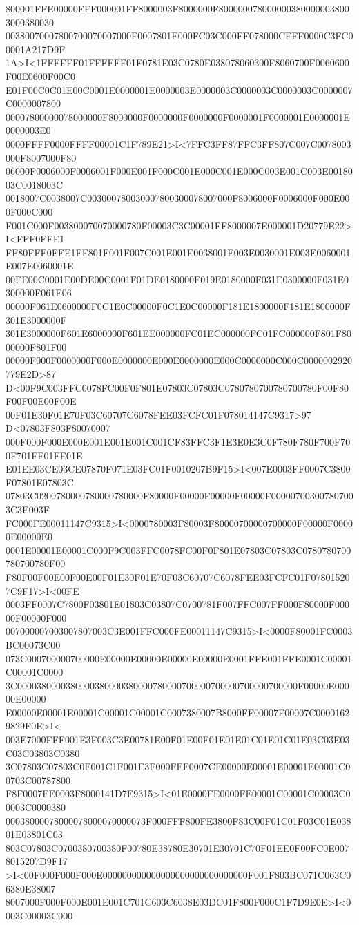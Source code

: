 800001FFE00000FFF000001FF8000003F8000000F8000000780000003800000038003000380030
00380070007800700070007000F0007801E000FC03C000FF078000CFFF0000C3FC00001A217D9F
1A>I<1FFFFFF01FFFFFF01F0781E03C0780E038078060300F8060700F0060600F00E0600F00C0
E01F00C0C01E00C0001E0000001E0000003E0000003C0000003C0000003C0000007C0000007800
00007800000078000000F8000000F0000000F0000000F0000001F0000001E0000001E0000003E0
0000FFFF0000FFFF00001C1F789E21>I<7FFC3FF87FFC3FF807C007C0078003000F8007000F80
06000F0006000F0006001F000E001F000C001E000C001E000C003E001C003E0018003C0018003C
0018007C0038007C003000780030007800300078007000F8006000F0006000F000E000F000C000
F001C000F003800070070000780F00003C3C00001FF8000007E000001D20779E22>I<FFF0FFE1
FF80FFF0FFE1FF801F001F007C001E001E0038001E003E0030001E003E0060001E007E0060001E
00FE00C0001E00DE00C0001F01DE0180000F019E0180000F031E0300000F031E0300000F061E06
00000F061E0600000F0C1E0C00000F0C1E0C00000F181E1800000F181E1800000F301E3000000F
301E3000000F601E6000000F601EE000000FC01EC000000FC01FC000000F801F8000000F801F00
00000F000F0000000F000E0000000E000E0000000E000C0000000C000C0000002920779E2D>87
D<00F9C003FFC0078FC00F0F801E07803C07803C0780780700780700780F00F80F00F00E00F00E
00F01E30F01E70F03C60707C6078FEE03FCFC01F078014147C9317>97 D<07803F803F80070007
000F000F000E000E001E001E001C001CF83FFC3F1E3E0E3C0F780F780F700F700F701FF01FE01E
E01EE03CE03CE07870F071E03FC01F0010207B9F15>I<007E0003FF0007C3800F07801E07803C
07803C0200780000780000780000F80000F00000F00000F00000F000007003007807003C3E003F
FC000FE00011147C9315>I<0000780003F80003F80000700000700000F00000F00000E00000E0
0001E00001E00001C000F9C003FFC0078FC00F0F801E07803C07803C0780780700780700780F00
F80F00F00E00F00E00F01E30F01E70F03C60707C6078FEE03FCFC01F078015207C9F17>I<00FE
0003FF0007C7800F03801E01803C03807C0700781F007FFC007FF000F80000F00000F00000F000
007000007003007807003C3E001FFC000FE00011147C9315>I<0000F80001FC0003BC00073C00
073C000700000700000E00000E00000E00000E00000E0001FFE001FFE0001C00001C00001C0000
3C0000380000380000380000380000780000700000700000700000700000F00000E00000E00000
E00000E00001E00001C00001C00001C0007380007B8000FF00007F00007C00001629829F0E>I<
003E7000FFF001E3F003C3E00781E00F01E00F01E01E01C01E01C01E03C03E03C03C03803C0380
3C07803C07803C0F001C1F001E3F000FFF0007CE00000E00001E00001E00001C00703C00787800
F8F0007FE0003F8000141D7E9315>I<01E0000FE0000FE00001C00001C00003C00003C0000380
00038000078000078000070000073F000FFF800FE3800F83C00F01C01F03C01E03801E03801C03
803C07803C0700380700380F00780E38780E30701E30701C70F01EE0F00FC0E0078015207D9F17
>I<00F000F000F000E000000000000000000000000000000F001F803BC071C063C06380E38007
8007000F000F000E001E001C701C603C6038E03DC01F800F000C1F7D9E0E>I<0003C00003C000
